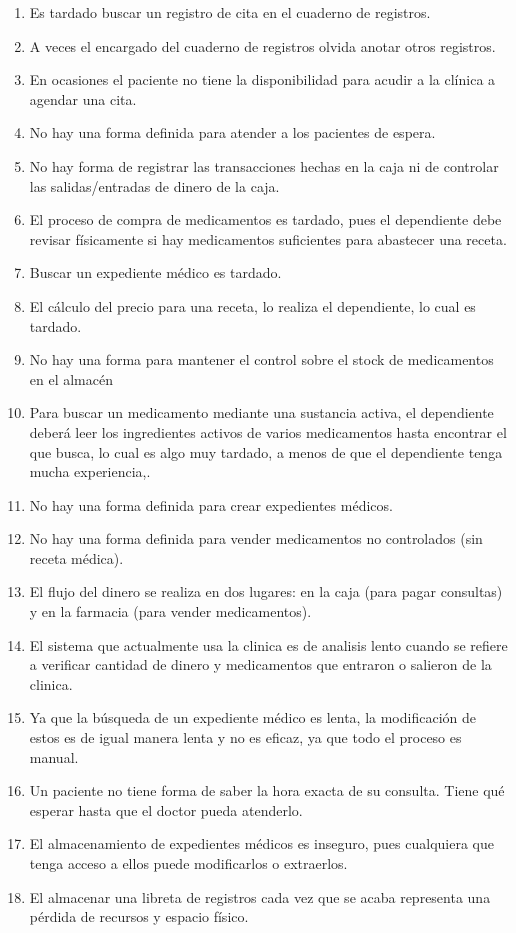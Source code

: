 \begin{enumerate}
\item Es tardado buscar un registro de cita en el cuaderno de registros.
\item A veces el encargado del cuaderno de registros olvida anotar otros registros.
\item En ocasiones el paciente no tiene la disponibilidad para acudir a la cl\'inica a agendar una cita.
\item No hay una forma definida para atender a los pacientes de espera.
\item No hay forma de registrar las transacciones hechas en la caja ni de controlar las salidas/entradas de dinero de la caja.
\item El proceso de compra de medicamentos es tardado, pues el dependiente debe revisar f\'isicamente si hay medicamentos suficientes para abastecer una receta.
\item Buscar un expediente m\'edico es tardado.
\item El c\'alculo del precio para una receta, lo realiza el dependiente, lo cual es tardado.
\item No hay una forma para mantener el control sobre el stock de medicamentos en el almac\'en
\item Para buscar un medicamento mediante una sustancia activa, el dependiente deber\'a leer los ingredientes activos de varios medicamentos hasta encontrar el que busca, lo cual es algo muy tardado, a menos de que el dependiente tenga mucha experiencia,.
\item No hay una forma definida para crear expedientes m\'edicos.
\item No hay una forma definida para vender medicamentos no controlados (sin receta m\'edica).
\item El flujo del dinero se realiza en dos lugares: en la caja (para pagar consultas) y en la farmacia (para vender medicamentos).
\item El sistema que actualmente usa la clinica es de analisis lento cuando se refiere a verificar cantidad de dinero y medicamentos que entraron o salieron de la clinica.%
\item Ya que la b\'usqueda de un expediente m\'edico es lenta, la modificaci\'on de estos es de igual manera lenta y no es eficaz, ya que todo el proceso es manual. %
\item Un paciente no tiene forma de saber la hora exacta de su consulta. Tiene qu\'e esperar hasta que el doctor pueda atenderlo.
\item El almacenamiento de expedientes m\'edicos es inseguro, pues cualquiera que tenga acceso a ellos puede modificarlos o extraerlos.
\item El almacenar una libreta de registros cada vez que se acaba representa una p\'erdida de recursos y espacio f\'isico.

\end{enumerate}

